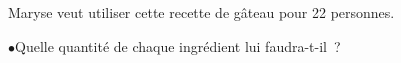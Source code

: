 \documentclass[exercice]{thedocument}%
\begin{document}
%
\par\medskip\noindent
Maryse veut utiliser cette recette de gâteau pour 22 personnes.\par\medskip
$\bullet$\quad Quelle quantité de chaque ingrédient lui faudra-t-il~?
\end{document}
